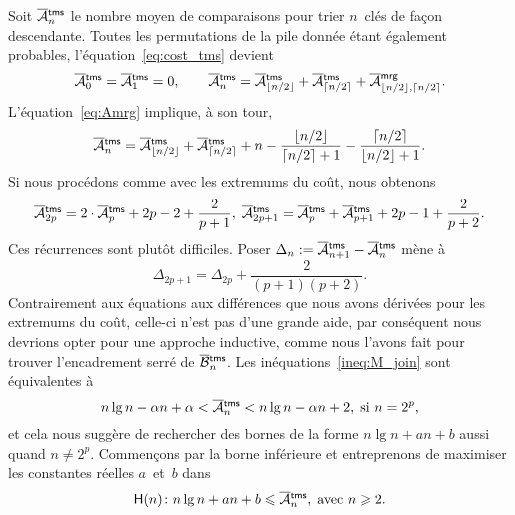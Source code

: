 
Soit \(\OM{\fun{tms}}{n}\) le nombre
moyen de comparaisons pour trier \(n\)~clés de façon
descendante. Toutes les permutations de la pile donnée étant également
probables, l'équation~\eqref{eq:cost_tms} devient
\begin{equation*}
\OM{\fun{tms}}{0} = \OM{\fun{tms}}{1} = 0,\qquad
\OM{\fun{tms}}{n} = \OM{\fun{tms}}{\floor{n/2}} +
\OM{\fun{tms}}{\ceiling{n/2}} +
\OM{\fun{mrg}}{\floor{n/2},\ceiling{n/2}}.\index{mrg@\fun{mrg/2}}
\end{equation*}
L'équation~\eqref{eq:Amrg} implique, à son tour,
\begin{equation*}
\OM{\fun{tms}}{n} = \OM{\fun{tms}}{\floor{n/2}} +
\OM{\fun{tms}}{\ceiling{n/2}} + n -
\frac{\floor{n/2}}{\ceiling{n/2}+1}
- \frac{\ceiling{n/2}}{\floor{n/2}+1}.
\end{equation*}
Si nous procédons comme avec les extremums du coût, nous obtenons
\begin{equation*}
\OM{\fun{tms}}{2p} = 2\cdot\OM{\fun{tms}}{p} + 2p - 2 +
\frac{2}{p+1},\; \OM{\fun{tms}}{2p+1} = \OM{\fun{tms}}{p} +
\OM{\fun{tms}}{p+1} + 2p - 1 + \frac{2}{p+2}.
\end{equation*}
Ces récurrences sont plutôt difficiles. Poser \(\Delta_n :=
\OM{\fun{tms}}{n+1} - \OM{\fun{tms}}{n}\) mène à
\begin{equation*}
\Delta_{2p+1} = \Delta_{2p} + \frac{2}{(p+1)(p+2)}.
\end{equation*}
Contrairement aux équations aux différences que nous avons dérivées
pour les extremums du coût, celle-ci n'est pas d'une grande aide, par
conséquent nous devrions opter pour une approche inductive, comme nous
l'avons fait pour trouver l'encadrement serré de
\(\OB{\fun{tms}}{n}\). Les inéquations~\eqref{ineq:M_join}
 sont équivalentes à
\begin{equation*}
  n\lg n - \alpha n +
\alpha < \OM{\fun{tms}}{n} < n\lg n - \alpha n + 2,\; \text{si \(n =
  2^p\),}
\end{equation*}
et cela nous suggère de rechercher des bornes de la forme \(n\lg n +
an + b\) aussi quand \(n \neq 2^p\). Commençons par la borne
inférieure et entreprenons de maximiser les constantes réelles
\(a\)~et~\(b\) dans
\begin{equation*}
\abovedisplayskip=0pt
\belowdisplayskip=2pt
\pred{H}{n} \colon n\lg n + an + b \leqslant \OM{\fun{tms}}{n},
\; \text{avec \(n \geqslant 2\).}
\end{equation*}
